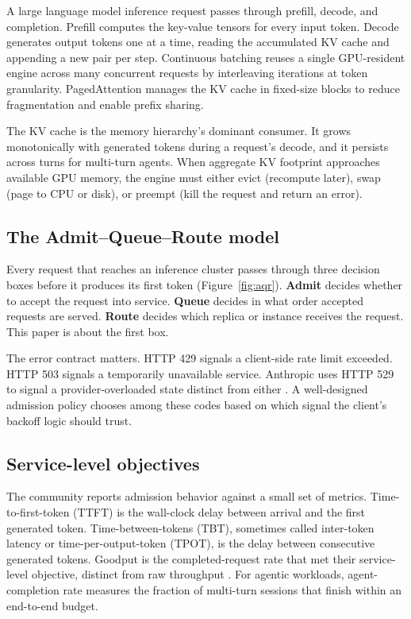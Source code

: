 A large language model inference request passes through prefill,
decode, and completion. Prefill computes the key-value tensors for
every input token. Decode generates output tokens one at a time,
reading the accumulated KV cache and appending a new pair per step.
Continuous batching \citep{yu2022orca} reuses a single GPU-resident
engine across many concurrent requests by interleaving iterations at
token granularity. PagedAttention \citep{kwon2023pagedattention} manages
the KV cache in fixed-size blocks to reduce fragmentation and enable
prefix sharing.

The KV cache is the memory hierarchy's dominant consumer. It grows
monotonically with generated tokens during a request's decode, and it
persists across turns for multi-turn agents. When aggregate KV
footprint approaches available GPU memory, the engine must either
evict (recompute later), swap (page to CPU or disk), or preempt (kill
the request and return an error).

\subsection{The Admit--Queue--Route model}

Every request that reaches an inference cluster passes through three
decision boxes before it produces its first token
(Figure~\ref{fig:aqr}). \textbf{Admit} decides whether to accept the
request into service. \textbf{Queue} decides in what order accepted
requests are served. \textbf{Route} decides which replica or instance
receives the request. This paper is about the first box.

The error contract matters. HTTP 429 signals a client-side rate limit
exceeded. HTTP 503 signals a temporarily unavailable service.
Anthropic uses HTTP 529 to signal a provider-overloaded state distinct
from either \citep{anthropic_api_errors}. A well-designed admission
policy chooses among these codes based on which signal the client's
backoff logic should trust.

\subsection{Service-level objectives}

The community reports admission behavior against a small set of
metrics. Time-to-first-token (TTFT) is the wall-clock delay between
arrival and the first generated token. Time-between-tokens (TBT),
sometimes called inter-token latency or time-per-output-token (TPOT),
is the delay between consecutive generated tokens. Goodput is the
completed-request rate that met their service-level objective, distinct
from raw throughput \citep{zhong2024distserve}. For agentic workloads,
agent-completion rate measures the fraction of multi-turn sessions
that finish within an end-to-end budget.

